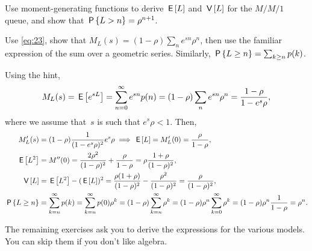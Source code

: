 \documentclass[stochastic-or.tex]{subfiles}
\begin{document}
\begin{exercise}\label{ex:34}
Use moment-generating functions to derive $\E\L$ and $\V\L$ for the $M/M/1$ queue, and show that $\P{L>n} = \rho^{n+1}$.
\begin{hint}
Use \cref{eq:23}, show that $M_L(s) = (1-\rho) \sum_n e^{s n} \rho^n$, then use the familiar expression of the sum over a geometric series.
Similarly, $\P{\L\geq n} = \sum_{k\geq n} p(k)$.
\end{hint}
\begin{solution}
Using the hint,
\begin{equation*}
 M_L(s) = \E{e^{s L}} = \sum_{n=0}^\infty e^{s n}p(n) = (1-\rho) \sum_n e^{s n} \rho^n=\frac{1-\rho}{1-e^{s}\rho},
\end{equation*}
where we assume that~$s$ is such that $e^s \rho < 1$. Then,
\begin{align*}
 M_L'(s) &= (1-\rho) \frac{1}{(1-e^s\rho)^2} e^s \rho \implies \E\L = M_L'(0)= \frac{\rho}{1-\rho}, \\
 \E{\L^2}&= M''(0)= \frac{2\rho^2}{(1-\rho)^2} + \frac{\rho}{1-\rho} = \rho \frac{1+\rho}{(1-\rho)^{2}},\\
\V\L &= \E{L^2} - (\E\L)^2 = \frac{\rho(1+\rho)}{(1-\rho)^2}-\frac{\rho^2}{(1-\rho)^2} = \frac{\rho}{(1-\rho)^2},\\
 \P{\L\geq n}
 &= \sum_{k=n}^\infty p(k) = \sum_{k=n}^\infty p(0)\rho^k = (1-\rho)\sum_{k=n}^\infty \rho^k
= (1-\rho)\rho^n \sum_{k=0}^\infty\rho^k = (1-\rho) \rho^n \frac1{1-\rho} = \rho^n.
\end{align*}
\end{solution}
\end{exercise}


The remaining exercises ask you to derive the  expressions for the various models. You can skip them if you don't like algebra.
\end{document}
